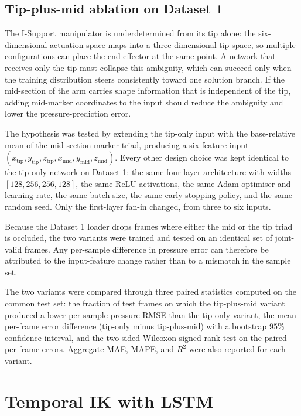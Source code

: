 \subsection{Tip-plus-mid ablation on Dataset 1}
\label{sec:mlp_tipmid}

The I-Support manipulator is underdetermined from its tip alone: the six-dimensional actuation space maps into a three-dimensional tip space, so multiple configurations can place the end-effector at the same point. A network that receives only the tip must collapse this ambiguity, which can succeed only when the training distribution steers consistently toward one solution branch. If the mid-section of the arm carries shape information that is independent of the tip, adding mid-marker coordinates to the input should reduce the ambiguity and lower the pressure-prediction error.

The hypothesis was tested by extending the tip-only input with the base-relative mean of the mid-section marker triad, producing a six-feature input $(x_{\mathrm{tip}}, y_{\mathrm{tip}}, z_{\mathrm{tip}}, x_{\mathrm{mid}}, y_{\mathrm{mid}}, z_{\mathrm{mid}})$. Every other design choice was kept identical to the tip-only network on Dataset 1: the same four-layer architecture with widths $[128, 256, 256, 128]$, the same ReLU activations, the same Adam optimiser and learning rate, the same batch size, the same early-stopping policy, and the same random seed. Only the first-layer fan-in changed, from three to six inputs.

Because the Dataset 1 loader drops frames where either the mid or the tip triad is occluded, the two variants were trained and tested on an identical set of joint-valid frames. Any per-sample difference in pressure error can therefore be attributed to the input-feature change rather than to a mismatch in the sample set.

The two variants were compared through three paired statistics computed on the common test set: the fraction of test frames on which the tip-plus-mid variant produced a lower per-sample pressure RMSE than the tip-only variant, the mean per-frame error difference (tip-only minus tip-plus-mid) with a bootstrap $95\%$ confidence interval, and the two-sided Wilcoxon signed-rank test on the paired per-frame errors. Aggregate MAE, MAPE, and $R^{2}$ were also reported for each variant.

\section{Temporal IK with LSTM}
\label{sec:lstm}

